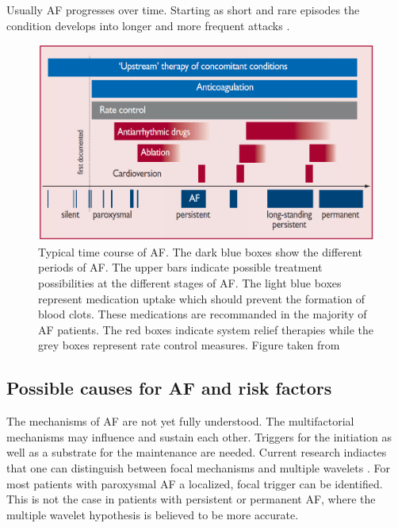 \documentclass[type=dr, dr=rernat, accentcolor=tud7b,colorbacktitle, bigchapter, openright, twoside, 12pt ]{tudthesis}
\begin{document}
Usually AF progresses over time. Starting as short and rare episodes the condition develops into longer and more frequent attacks 
\cite{ESC10}. 

\begin{figure}[H]
\begin{center}
\includegraphics[scale=0.3]{af_over_time.png}
\caption{Typical time course of AF. The dark blue boxes show the different periods of AF. The upper bars indicate possible treatment 
possibilities at the different stages of AF. The light blue boxes represent medication uptake which should prevent the formation of blood 
clots. These medications are recommanded in the majority of AF patients. The red boxes indicate system relief therapies while the grey 
boxes represent rate control measures. Figure taken from \cite{ESC10}}
\label{afovertime}
\end{center}
\end{figure}



\subsection*{Possible causes for AF and risk factors}

The mechanisms of AF are not yet fully understood. The multifactorial mechanisms may influence and sustain each other. Triggers for the 
initiation as well as a substrate for the maintenance are needed. Current research indiactes that one can distinguish between focal 
mechanisms and multiple wavelets \cite{CE09}. For most patients with paroxysmal AF a localized, focal trigger can be identified. This is 
not the case in patients with persistent or permanent AF, where the multiple wavelet hypothesis is believed to be more accurate.\newline
\end{document}
